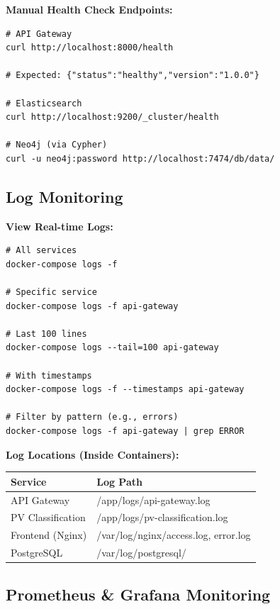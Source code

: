 \textbf{Manual Health Check Endpoints:}
\begin{commandbox}
\begin{lstlisting}[style=bashstyle]
# API Gateway
curl http://localhost:8000/health

# Expected: {"status":"healthy","version":"1.0.0"}

# Elasticsearch
curl http://localhost:9200/_cluster/health

# Neo4j (via Cypher)
curl -u neo4j:password http://localhost:7474/db/data/
\end{lstlisting}
\end{commandbox}

\subsection{Log Monitoring}

\textbf{View Real-time Logs:}
\begin{commandbox}
\begin{lstlisting}[style=bashstyle]
# All services
docker-compose logs -f

# Specific service
docker-compose logs -f api-gateway

# Last 100 lines
docker-compose logs --tail=100 api-gateway

# With timestamps
docker-compose logs -f --timestamps api-gateway

# Filter by pattern (e.g., errors)
docker-compose logs -f api-gateway | grep ERROR
\end{lstlisting}
\end{commandbox}

\textbf{Log Locations (Inside Containers):}
\begin{table}[h]
\centering
\begin{tabularx}{\textwidth}{lX}
\toprule
\textbf{Service} & \textbf{Log Path} \\
\midrule
API Gateway & /app/logs/api-gateway.log \\
PV Classification & /app/logs/pv-classification.log \\
Frontend (Nginx) & /var/log/nginx/access.log, error.log \\
PostgreSQL & /var/log/postgresql/ \\
\bottomrule
\end{tabularx}
\end{table}

\subsection{Prometheus \& Grafana Monitoring}


